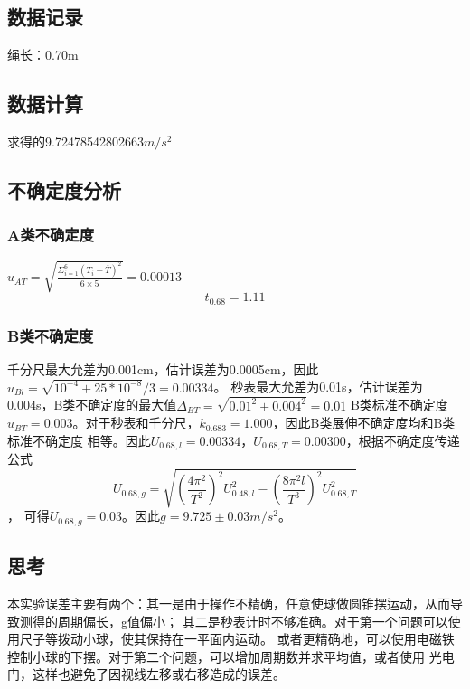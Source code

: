 \documentclass[UTF8]{ctexart}
\begin{document}
\subsection*{数据记录}
绳长：0.70m
\begin{table}[hp]
    \centering
    \fontsize{8}{10}\selectfont
    \caption{单摆法测重力加速度}
\end{table}
\subsection*{数据计算}
求得的9.72478542802663$m/s^2$
\subsection*{不确定度分析}
\subsubsection*{A类不确定度}
$u_{AT}=\sqrt{\frac{\Sigma_{i=1}^6\left( T_i-\overline{T} \right)^2}{6\times 5}}=0.00013$
\[t_{0.68}=1.11\]
\subsubsection*{B类不确定度}
千分尺最大允差为0.001cm，估计误差为0.0005cm，因此$u_{Bl}=\sqrt{10^{-4}+25*10^{-8}}/3=0.00334$。
秒表最大允差为0.01s，估计误差为0.004s，B类不确定度的最大值$\Delta_{BT}=\sqrt{0.01^2+0.004^2}=0.01$
B类标准不确定度$u_{BT}=0.003$。对于秒表和千分尺，$k_{0.683}=1.000$，因此B类展伸不确定度均和B类标准不确定度
相等。因此$U_{0.68,l}=0.00334$，$U_{0.68,T}=0.00300$，根据不确定度传递公式
\[U_{0.68,g}=\sqrt{\left(  \frac{4\pi^2}{T^2}\right)^2U_{0.48,l}^2-\left(  \frac{8\pi^2l}{T^3}\right)^2U_{0.68,T}^2}\]，
可得$U_{0.68,g}=0.03$。因此$g=9.725\pm 0.03m/s^2$。
\subsection*{思考}
本实验误差主要有两个：其一是由于操作不精确，任意使球做圆锥摆运动，从而导致测得的周期偏长，g值偏小；
其二是秒表计时不够准确。对于第一个问题可以使用尺子等拨动小球，使其保持在一平面内运动。
或者更精确地，可以使用电磁铁控制小球的下摆。对于第二个问题，可以增加周期数并求平均值，或者使用
光电门，这样也避免了因视线左移或右移造成的误差。
\end{document}
